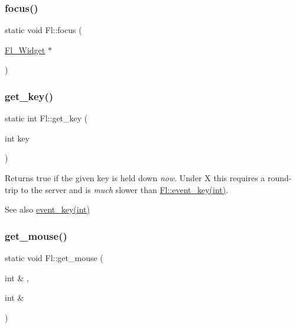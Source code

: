 \subsubsection{\texorpdfstring{focus()}{focus()}\hspace{0.1cm}{\footnotesize\ttfamily [2/2]}}
{\footnotesize\ttfamily static void Fl\+::focus (\begin{DoxyParamCaption}\item[{\hyperlink{class_fl___widget}{Fl\+\_\+\+Widget} $\ast$}]{ }\end{DoxyParamCaption})\hspace{0.3cm}{\ttfamily [static]}}

\mbox{\label{group__fl__events_gae7cc46c942d3b62b6b55422d185b6b8d}} 
\subsubsection{\texorpdfstring{get\+\_\+key()}{get\_key()}}
{\footnotesize\ttfamily static int Fl\+::get\+\_\+key (\begin{DoxyParamCaption}\item[{int}]{key }\end{DoxyParamCaption})\hspace{0.3cm}{\ttfamily [static]}}

Returns true if the given {\ttfamily key} is held down {\itshape now}. Under X this requires a round-\/trip to the server and is {\itshape much} slower than \hyperlink{group__fl__events_ga0647361133efe8f9bdbcf6d462116236}{Fl\+::event\+\_\+key(int)}. \begin{DoxySeeAlso}{See also}
\hyperlink{group__fl__events_ga0647361133efe8f9bdbcf6d462116236}{event\+\_\+key(int)} 
\end{DoxySeeAlso}
\mbox{\label{group__fl__events_ga79a94c0ac0f71557ef4b6dc7b8d863db}} 
\subsubsection{\texorpdfstring{get\+\_\+mouse()}{get\_mouse()}}
{\footnotesize\ttfamily static void Fl\+::get\+\_\+mouse (\begin{DoxyParamCaption}\item[{int \&}]{,  }\item[{int \&}]{ }\end{DoxyParamCaption})\hspace{0.3cm}{\ttfamily [static]}}

